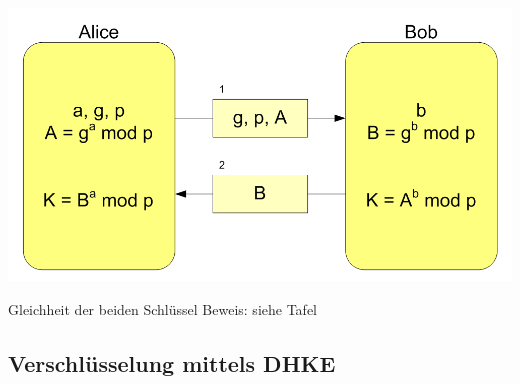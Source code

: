 \documentclass[utf8]{beamer}
\begin{document}
\begin{frame}{\insertsubsectionhead}
  \begin{center}
    \includegraphics[width=\textwidth]{Diffie-Hellman-Schluesselaustausch2.png}
  \end{center}
\end{frame}

\begin{frame}[t]{Gleichheit der beiden Schlüssel}
  Beweis: siehe Tafel
\end{frame}

\subsection{Verschlüsselung mittels DHKE}
\label{sub:verschlusselung_mittels_dhke}
\end{document}
